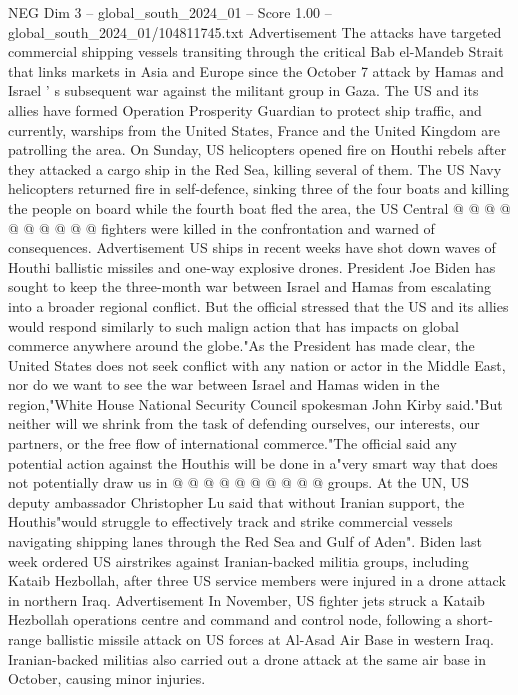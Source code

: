 \begin{textsample}{NEG Dim 3 – global\_south\_2024\_01 – Score 1.00 – global\_south\_2024\_01/104811745.txt}
Advertisement The attacks have targeted commercial shipping vessels transiting through the critical Bab el-Mandeb Strait that links markets in Asia and Europe since the October 7 attack by Hamas and Israel ' s subsequent war against the militant group in Gaza.
The US and its allies have formed Operation Prosperity Guardian to protect ship traffic, and currently, warships from the United States, France and the United Kingdom are patrolling the area.
On Sunday, US helicopters opened fire on Houthi rebels after they attacked a cargo ship in the Red Sea, killing several of them.
The US Navy helicopters returned fire in self-defence, sinking three of the four boats and killing the people on board while the fourth boat fled the area, the US Central @ @ @ @ @ @ @ @ @ @ fighters were killed in the confrontation and warned of consequences.
Advertisement US ships in recent weeks have shot down waves of Houthi ballistic missiles and one-way explosive drones.
President Joe Biden has sought to keep the three-month war between Israel and Hamas from escalating into a broader regional conflict.
But the official stressed that the US and its allies would respond similarly to such malign action that has impacts on global commerce anywhere around the globe."As the President has made clear, the United States does not seek conflict with any nation or actor in the Middle East, nor do we want to see the war between Israel and Hamas widen in the region,"White House National Security Council spokesman John Kirby said."But neither will we shrink from the task of defending ourselves, our interests, our partners, or the free flow of international commerce."The official said any potential action against the Houthis will be done in a"very smart way that does not potentially draw us in @ @ @ @ @ @ @ @ @ @ groups.
At the UN, US deputy ambassador Christopher Lu said that without Iranian support, the Houthis"would struggle to effectively track and strike commercial vessels navigating shipping lanes through the Red Sea and Gulf of Aden".
Biden last week ordered US airstrikes against Iranian-backed militia groups, including Kataib Hezbollah, after three US service members were injured in a drone attack in northern Iraq.
Advertisement In November, US fighter jets struck a Kataib Hezbollah operations centre and command and control node, following a short-range ballistic missile attack on US forces at Al-Asad Air Base in western Iraq.
Iranian-backed militias also carried out a drone attack at the same air base in October, causing minor injuries.

\end{textsample}

